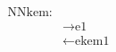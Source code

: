 \documentclass[tikz]{standalone}
\begin{document}
\label{not:NNkem}
$
\begin{array}{rl}
\text{NNkem:}\\
&\rightarrow \text{e1}\\
&\leftarrow \text{ekem1}\\
\end{array}
$
\end{document}
